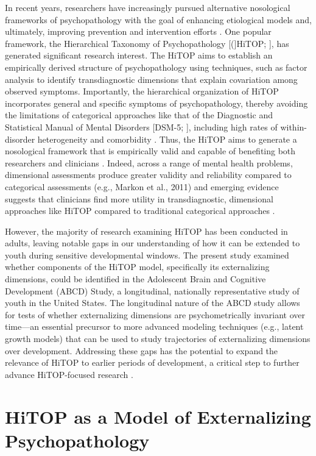 \documentclass[
  20pt,
  number,
  preprint,
  3p,
  twocolumn]{elsarticle}
\begin{document}
In recent years, researchers have increasingly pursued alternative
nosological frameworks of psychopathology with the goal of enhancing
etiological models and, ultimately, improving prevention and
intervention efforts \citep{eaton2023}. One popular framework, the
Hierarchical Taxonomy of Psychopathology {[}({]}HiTOP;
\citep{kotov2017}{]}, has generated significant research interest. The
HiTOP aims to establish an empirically derived structure of
psychopathology using techniques, such as factor analysis to identify
transdiagnostic dimensions that explain covariation among observed
symptoms. Importantly, the hierarchical organization of HiTOP
incorporates general and specific symptoms of psychopathology, thereby
avoiding the limitations of categorical approaches like that of the
Diagnostic and Statistical Manual of Mental Disorders {[}DSM-5;
\citep{apa2013}{]}, including high rates of within-disorder
heterogeneity and comorbidity \citep{conway2022}. Thus, the HiTOP aims
to generate a nosological framework that is empirically valid and
capable of benefiting both researchers and clinicians \citep{kotov2021}.
Indeed, across a range of mental health problems, dimensional
assessments produce greater validity and reliability compared to
categorical assessments (e.g., Markon et al., 2011) and emerging
evidence suggests that clinicians find more utility in transdiagnostic,
dimensional approaches like HiTOP compared to traditional categorical
approaches \citep[e.g.,][]{balling2023}.

However, the majority of research examining HiTOP has been conducted in
adults, leaving notable gaps in our understanding of how it can be
extended to youth during sensitive developmental windows. The present
study examined whether components of the HiTOP model, specifically its
externalizing dimensions, could be identified in the Adolescent Brain
and Cognitive Development (ABCD) Study, a longitudinal, nationally
representative study of youth in the United States. The longitudinal
nature of the ABCD study allows for tests of whether externalizing
dimensions are psychometrically invariant over time---an essential
precursor to more advanced modeling techniques (e.g., latent growth
models) that can be used to study trajectories of externalizing
dimensions over development. Addressing these gaps has the potential to
expand the relevance of HiTOP to earlier periods of development, a
critical step to further advance HiTOP-focused research
\citep{tackett2022}.

\hypertarget{hitop-as-a-model-of-externalizing-psychopathology}{%
\section{HiTOP as a Model of Externalizing
Psychopathology}\label{hitop-as-a-model-of-externalizing-psychopathology}}
\end{document}
